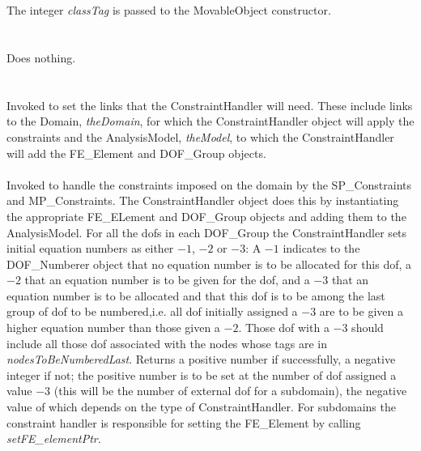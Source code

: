  \\
\\ 
The integer {\em classTag} is passed to the MovableObject constructor. \\

 \\
\\ 
Does nothing. \\

\\
 \\
Invoked to set the links that the ConstraintHandler will need. These
include links to the Domain, {\em theDomain}, for which the
ConstraintHandler object will apply the constraints and the
AnalysisModel, {\em theModel}, to which the ConstraintHandler will add
the FE\_Element and DOF\_Group objects. \\

 \\
Invoked to handle the constraints imposed on the domain by the
SP\_Constraints and MP\_Constraints. The ConstraintHandler object does
this by instantiating the appropriate FE\_ELement and DOF\_Group objects 
and adding them to the AnalysisModel. For all the dofs in each
DOF\_Group the ConstraintHandler sets initial equation numbers as
either $-1$, $-2$ or $-3$: A $-1$ indicates to the DOF\_Numberer object
that no equation number is to be allocated for this dof, a $-2$ that
an equation number is to be given for the dof, and a $-3$ that an
equation number is to be allocated and that this dof is to
be among the last group of dof to be numbered,i.e. all dof initially
assigned a $-3$ are to be given a higher equation number than those
given a $-2$. Those dof with a $-3$ should include all those dof
associated with the nodes whose tags are in {\em
nodesToBeNumberedLast}. Returns a positive number if successfully, a
negative integer if not; the positive number is to be set at the
number of dof assigned a value $-3$ (this will be the number of
external dof for a subdomain), the negative value of which depends on
the type of ConstraintHandler. For subdomains the constraint handler
is responsible for setting the FE\_Element by calling {\em
setFE\_elementPtr}. \\    

